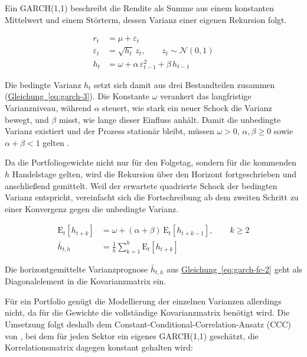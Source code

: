 \documentclass[12pt,a4paper]{article}
\begin{document}
Ein GARCH(1,1) beschreibt die Rendite als Summe aus einem konstanten Mittelwert und einem Störterm, dessen Varianz einer eigenen Rekursion folgt.

\begin{align}
	\label{eq:garch-1}
	r_t &= \mu + \varepsilon_t \\
	\label{eq:garch-2}
	\varepsilon_t &= \sqrt{h_t}\,z_t, \qquad z_t \sim \mathcal{N}(0,1) \\
	\label{eq:garch-3}
	h_t &= \omega + \alpha\,\varepsilon_{t-1}^2 + \beta\,h_{t-1}
\end{align}

Die bedingte Varianz $h_t$ setzt sich damit aus drei Bestandteilen zusammen (\hyperref[eq:garch-3]{Gleichung~\ref*{eq:garch-3}}).
Die Konstante $\omega$ verankert das langfristige Varianzniveau, während $\alpha$ steuert, wie stark ein neuer Schock die Varianz bewegt, und $\beta$ misst, wie lange dieser Einfluss anhält.
Damit die unbedingte Varianz existiert und der Prozess stationär bleibt, müssen $\omega > 0$, $\alpha, \beta \geq 0$ sowie $\alpha + \beta < 1$ gelten \parencite{bollerslev1986}.

Da die Portfoliogewichte nicht nur für den Folgetag, sondern für die kommenden $h$ Handelstage gelten, wird die Rekursion über den Horizont fortgeschrieben und anschließend gemittelt.
Weil der erwartete quadrierte Schock der bedingten Varianz entspricht, vereinfacht sich die Fortschreibung ab dem zweiten Schritt zu einer Konvergenz gegen die unbedingte Varianz.

\begin{align}
	\label{eq:garch-fc-1}
	\mathrm{E}_t[h_{t+k}] &= \omega + (\alpha + \beta)\,\mathrm{E}_t[h_{t+k-1}], \qquad k \geq 2 \\
	\label{eq:garch-fc-2}
	\bar{h}_{t,h} &= \frac{1}{h}\sum_{k=1}^{h} \mathrm{E}_t[h_{t+k}]
\end{align}

Die horizontgemittelte Varianzprognose $\bar{h}_{t,h}$ aus \hyperref[eq:garch-fc-2]{Gleichung~\ref*{eq:garch-fc-2}} geht als Diagonalelement in die Kovarianzmatrix ein.

Für ein Portfolio genügt die Modellierung der einzelnen Varianzen allerdings nicht, da für die Gewichte die vollständige Kovarianzmatrix benötigt wird.
Die Umsetzung folgt deshalb dem Constant-Conditional-Correlation-Ansatz (CCC) von \textcite{bollerslev1990}, bei dem für jeden Sektor ein eigenes GARCH(1,1) geschätzt, die Korrelationsmatrix dagegen konstant gehalten wird:
\end{document}
